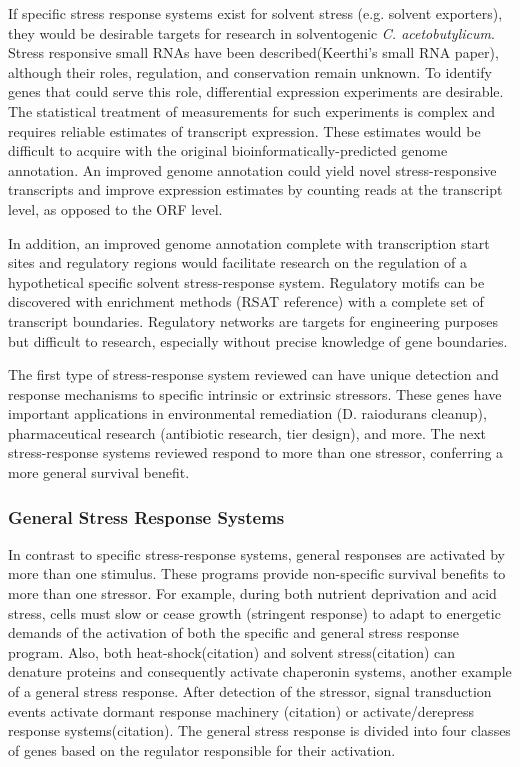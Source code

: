 If specific stress response systems exist for solvent stress (e.g. solvent exporters), they would be desirable targets for research in solventogenic \textit{C. acetobutylicum}. Stress responsive small RNAs have been described(Keerthi's small RNA paper), although their roles, regulation, and conservation remain unknown. To identify genes that could serve this role, differential expression experiments are desirable. The statistical treatment of measurements for such experiments is complex and requires reliable estimates of transcript expression. These estimates would be difficult to acquire with the original bioinformatically-predicted genome annotation. An improved genome annotation could yield novel stress-responsive transcripts and improve expression estimates by counting reads at the transcript level, as opposed to the ORF level.

In addition, an improved genome annotation complete with transcription start sites and regulatory regions would facilitate research on the regulation of a hypothetical specific solvent stress-response system. Regulatory motifs can be discovered with enrichment methods (RSAT reference) with a complete set of transcript boundaries. Regulatory networks are targets for engineering purposes but difficult to research, especially without precise knowledge of gene boundaries.

The first type of stress-response system reviewed can have unique detection and response mechanisms to specific intrinsic or extrinsic stressors. These genes have important applications in environmental remediation (D. raiodurans cleanup), pharmaceutical research (antibiotic research, tier design), and more. The next stress-response systems reviewed respond to more than one stressor, conferring a more general survival benefit.


\subsubsection{General Stress Response Systems}

In contrast to specific stress-response systems, general responses are activated by more than one stimulus. These programs provide non-specific survival benefits to more than one stressor. For example, during both nutrient deprivation and acid stress, cells must slow or cease growth (stringent response) to adapt to energetic demands of the activation of both the specific and general stress response program. Also, both heat-shock(citation) and solvent stress(citation) can denature proteins and consequently activate chaperonin systems, another example of a general stress response. After detection of the stressor, signal transduction events activate dormant response machinery (citation) or activate/derepress response systems(citation). The general stress response is divided into four classes of genes based on the regulator responsible for their activation. 

